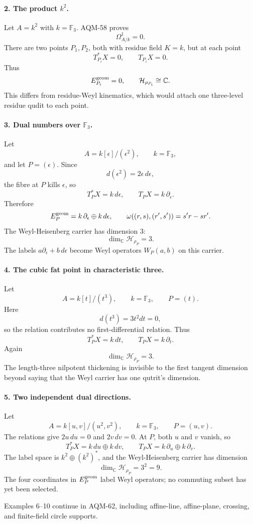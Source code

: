 \paragraph{2. The product \(k^2\).}
Let \(A=k^2\) with \(k=\mathbb F_3\).  AQM-58 proves
\[
  \Omega^1_{A/k}=0.
\]
There are two points \(P_1,P_2\), both with residue field \(K=k\), but at each
point
\[
  T_{P_i}^*X=0,\qquad T_{P_i}X=0.
\]
Thus
\[
  E_{P_i}^{\rm geom}=0,\qquad \mathcal H_{\rho_{P_i}}\cong\mathbb C.
\]
This differs from residue-Weyl kinematics, which would attach one
three-level residue qudit to each point.

\paragraph{3. Dual numbers over \(\mathbb F_3\).}
Let
\[
  A=k[\epsilon]/(\epsilon^2),\qquad k=\mathbb F_3,
\]
and let \(P=(\epsilon)\).  Since
\[
  d(\epsilon^2)=2\epsilon\,d\epsilon,
\]
the fibre at \(P\) kills \(\epsilon\), so
\[
  T_P^*X=k\,d\epsilon,\qquad T_PX=k\,\partial_\epsilon.
\]
Therefore
\[
  E_P^{\rm geom}=k\,\partial_\epsilon\oplus k\,d\epsilon,
  \qquad \omega((r,s),(r',s'))=s'r-sr'.
\]
The Weyl-Heisenberg carrier has dimension \(3\):
\[
  \dim_{\mathbb C}\mathcal H_{\rho_P}=3.
\]
The labels \(a\partial_\epsilon+b\,d\epsilon\) become Weyl operators
\(W_P(a,b)\) on this carrier.

\paragraph{4. The cubic fat point in characteristic three.}
Let
\[
  A=k[t]/(t^3),\qquad k=\mathbb F_3,\qquad P=(t).
\]
Here
\[
  d(t^3)=3t^2dt=0,
\]
so the relation contributes no first-differential relation.  Thus
\[
  T_P^*X=k\,dt,\qquad T_PX=k\,\partial_t.
\]
Again
\[
  \dim_{\mathbb C}\mathcal H_{\rho_P}=3.
\]
The length-three nilpotent thickening is invisible to the first tangent
dimension beyond saying that the Weyl carrier has one qutrit's dimension.

\paragraph{5. Two independent dual directions.}
Let
\[
  A=k[u,v]/(u^2,v^2),\qquad k=\mathbb F_3,\qquad P=(u,v).
\]
The relations give \(2u\,du=0\) and \(2v\,dv=0\).  At \(P\), both \(u\) and
\(v\) vanish, so
\[
  T_P^*X=k\,du\oplus k\,dv,\qquad T_PX=k\,\partial_u\oplus k\,\partial_v.
\]
The label space is \(k^2\oplus(k^2)^*\), and the Weyl-Heisenberg carrier has
dimension
\[
  \dim_{\mathbb C}\mathcal H_{\rho_P}=3^2=9.
\]
The four coordinates in \(E_P^{\rm geom}\) label Weyl operators; no commuting
subset has yet been selected.

Examples 6--10 continue in AQM-62, including affine-line, affine-plane,
crossing, and finite-field circle supports.

